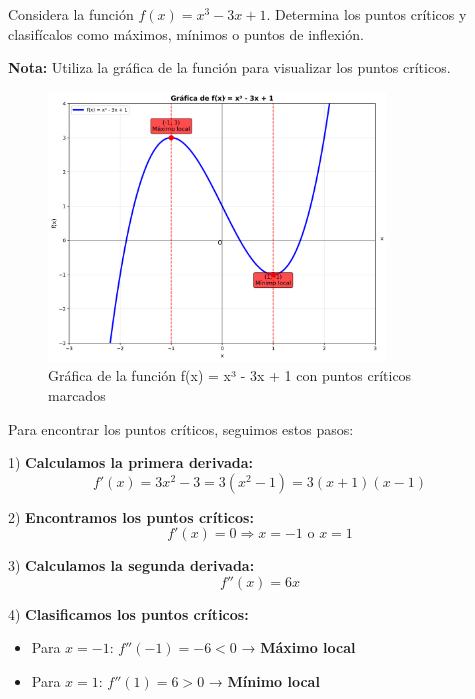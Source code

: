 \begin{ejercicio}[
  id=MATU_FUN_007,
  materia_principal=matematicas_preuniversitaria,
  codigo_materia=MATU,
  capitulo=funciones,
  subtema=funciones,
  nivel=intermedio,
  procedencia="Libro Cálculo Avanzado",
  visibilidad=web_impreso,
  tiempo_estimado=5,
  libros={calculo1, calculo_avanzado},
  dificultad=2,
  tags={funciones},
  youtube_url="https://www.youtube.com/watch?v=ejemplo_calculo",
  mostrar_solucion=true,
  libro_promocion=""
]
Considera la función $f(x) = x^3 - 3x + 1$. Determina los puntos críticos y clasifícalos como máximos, mínimos o puntos de inflexión.

\textbf{Nota:} Utiliza la gráfica de la función para visualizar los puntos críticos.

\begin{figure}[h]
\centering
\includegraphics[width=0.8\textwidth]{imagenes/funcion_cubica_001.png}
\caption{Gráfica de la función f(x) = x³ - 3x + 1 con puntos críticos marcados}
\label{fig:funcion_cubica}
\end{figure}

\begin{solucion}
Para encontrar los puntos críticos, seguimos estos pasos:

1) \textbf{Calculamos la primera derivada:}
   $$f'(x) = 3x^2 - 3 = 3(x^2 - 1) = 3(x+1)(x-1)$$

2) \textbf{Encontramos los puntos críticos:}
   $$f'(x) = 0 \Rightarrow x = -1 \text{ o } x = 1$$

3) \textbf{Calculamos la segunda derivada:}
   $$f''(x) = 6x$$

4) \textbf{Clasificamos los puntos críticos:}
   \begin{itemize}
   \item Para $x = -1$: $f''(-1) = -6 < 0$ → \textbf{Máximo local}
   \item Para $x = 1$: $f''(1) = 6 > 0$ → \textbf{Mínimo local}
   \end{itemize}


\end{solucion}
\end{ejercicio}
